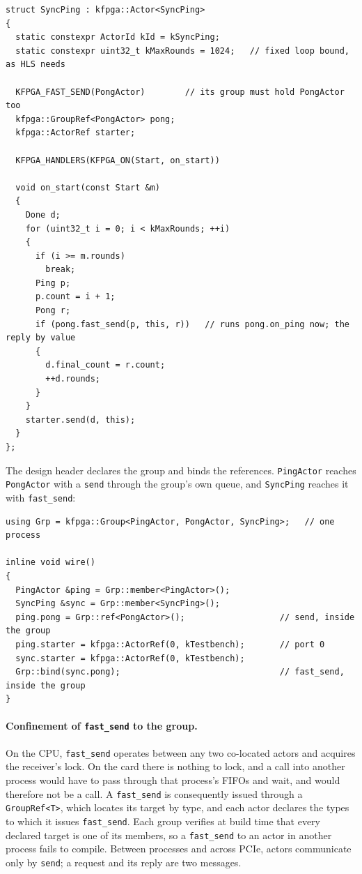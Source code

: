 \documentclass[11pt]{article}
\newcommand{\fs}{\texttt{fast\_send}}
\newcommand{\snd}{\texttt{send}}
\begin{document}
\begin{lstlisting}
struct SyncPing : kfpga::Actor<SyncPing>
{
  static constexpr ActorId kId = kSyncPing;
  static constexpr uint32_t kMaxRounds = 1024;   // fixed loop bound, as HLS needs

  KFPGA_FAST_SEND(PongActor)        // its group must hold PongActor too
  kfpga::GroupRef<PongActor> pong;
  kfpga::ActorRef starter;

  KFPGA_HANDLERS(KFPGA_ON(Start, on_start))

  void on_start(const Start &m)
  {
    Done d;
    for (uint32_t i = 0; i < kMaxRounds; ++i)
    {
      if (i >= m.rounds)
        break;
      Ping p;
      p.count = i + 1;
      Pong r;
      if (pong.fast_send(p, this, r))   // runs pong.on_ping now; the reply by value
      {
        d.final_count = r.count;
        ++d.rounds;
      }
    }
    starter.send(d, this);
  }
};
\end{lstlisting}

\noindent The design header declares the group and binds the references.
\texttt{PingActor} reaches \texttt{PongActor} with a \snd{} through the group's
own queue, and \texttt{SyncPing} reaches it with \fs{}:

\begin{lstlisting}
using Grp = kfpga::Group<PingActor, PongActor, SyncPing>;   // one process

inline void wire()
{
  PingActor &ping = Grp::member<PingActor>();
  SyncPing &sync = Grp::member<SyncPing>();
  ping.pong = Grp::ref<PongActor>();                   // send, inside the group
  ping.starter = kfpga::ActorRef(0, kTestbench);       // port 0
  sync.starter = kfpga::ActorRef(0, kTestbench);
  Grp::bind(sync.pong);                                // fast_send, inside the group
}
\end{lstlisting}

\paragraph{Confinement of \fs{} to the group.} On the CPU, \fs{}
operates between any two co-located actors and acquires the receiver's lock. On
the card there is nothing to lock, and a call into another process would have
to pass through that process's FIFOs and wait, and would therefore not be a
call. A \fs{} is consequently issued through a \texttt{GroupRef<T>}, which
locates its target by type, and each actor declares the types to which it
issues \fs{}. Each group verifies at build time that every declared target is
one of its members, so a \fs{} to an actor in another process fails to compile.
Between processes and across PCIe, actors communicate only by \snd{}; a request
and its reply are two messages.
\end{document}
